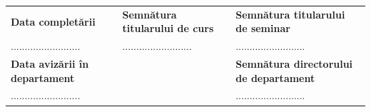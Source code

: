 \documentclass[11pt,a4paper]{article}
\begin{document}
\vspace{1cm}
\noindent
\begin{xltabular}{\textwidth}{X X X}
\textbf{Data completării} & \textbf{Semnătura titularului de curs} & \textbf{Semnătura titularului de seminar} \\
......................... & ......................... & ......................... \\[1cm]
\textbf{Data avizării în departament} & & \textbf{Semnătura directorului de departament} \\
......................... & & ......................... \\
\end{xltabular}
\end{document}
